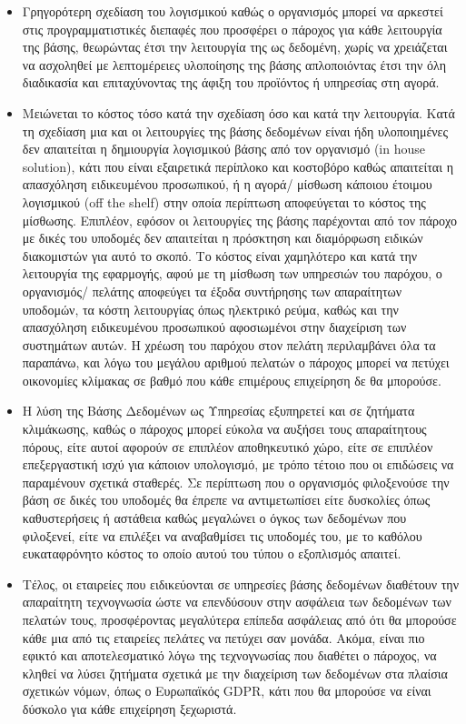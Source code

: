 \documentclass{article}
\begin{document}
\begin{itemize}
\item Γρηγορότερη σχεδίαση του λογισμικού καθώς ο οργανισμός μπορεί να αρκεστεί στις προγραμματιστικές διεπαφές που προσφέρει ο πάροχος για κάθε λειτουργία της βάσης, θεωρώντας έτσι την λειτουργία της ως δεδομένη, χωρίς να χρειάζεται να ασχοληθεί με λεπτομέρειες υλοποίησης της βάσης απλοποιόντας έτσι την όλη διαδικασία και επιταχύνοντας της άφιξη του προϊόντος ή υπηρεσίας στη αγορά.
\item Μειώνεται το κόστος τόσο κατά την σχεδίαση όσο και κατά την λειτουργία. Κατά τη σχεδίαση μια και οι λειτουργίες της βάσης δεδομένων είναι ήδη υλοποιημένες δεν απαιτείται η δημιουργία λογισμικού βάσης από τον οργανισμό (in house solution), κάτι που είναι εξαιρετικά περίπλοκο και κοστοβόρο καθώς απαιτείται η απασχόληση ειδικευμένου προσωπικού, ή η αγορά/ μίσθωση κάποιου έτοιμου λογισμικού (off the shelf) στην οποία περίπτωση αποφεύγεται το κόστος της μίσθωσης. Επιπλέον, εφόσον οι λειτουργίες της βάσης παρέχονται από τον πάροχο με δικές του υποδομές δεν απαιτείται η πρόσκτηση και διαμόρφωση ειδικών διακομιστών για αυτό το σκοπό. Το κόστος είναι χαμηλότερο και κατά την λειτουργία της εφαρμογής, αφού με τη μίσθωση των υπηρεσιών του παρόχου, ο οργανισμός/ πελάτης αποφεύγει τα έξοδα συντήρησης των απαραίτητων υποδομών, τα κόστη λειτουργίας όπως ηλεκτρικό ρεύμα, καθώς και την απασχόληση ειδικευμένου προσωπικού αφοσιωμένοι στην διαχείριση των συστημάτων αυτών. Η χρέωση του παρόχου στον πελάτη περιλαμβάνει όλα τα παραπάνω, και λόγω του μεγάλου αριθμού πελατών ο πάροχος μπορεί να πετύχει οικονομίες κλίμακας σε βαθμό που κάθε επιμέρους επιχείρηση δε θα μπορούσε.
\item Η λύση της Βάσης Δεδομένων ως Υπηρεσίας εξυπηρετεί και σε ζητήματα κλιμάκωσης, καθώς ο πάροχος μπορεί εύκολα να αυξήσει τους απαραίτητους πόρους, είτε αυτοί αφορούν σε επιπλέον αποθηκευτικό χώρο, είτε σε επιπλέον επεξεργαστική ισχύ για κάποιον υπολογισμό, με τρόπο τέτοιο που οι επιδώσεις να παραμένουν σχετικά σταθερές. Σε περίπτωση που ο οργανισμός φιλοξενούσε την βάση σε δικές του υποδομές θα έπρεπε να αντιμετωπίσει είτε δυσκολίες όπως καθυστερήσεις ή αστάθεια καθώς μεγαλώνει ο όγκος των δεδομένων που φιλοξενεί, είτε να επιλέξει να αναβαθμίσει τις υποδομές του, με το καθόλου ευκαταφρόνητο κόστος το οποίο αυτού του τύπου ο εξοπλισμός απαιτεί.
\item Τέλος, οι εταιρείες που ειδικεύονται σε υπηρεσίες βάσης δεδομένων διαθέτουν την απαραίτητη τεχνογνωσία ώστε να επενδύσουν στην ασφάλεια των δεδομένων των πελατών τους, προσφέροντας μεγαλύτερα επίπεδα ασφάλειας από ότι θα μπορούσε κάθε μια από τις εταιρείες πελάτες να πετύχει σαν μονάδα. Ακόμα, είναι πιο εφικτό και αποτελεσματικό λόγω της τεχνογνωσίας που διαθέτει ο πάροχος, να κληθεί να λύσει ζητήματα σχετικά με την διαχείριση των δεδομένων στα πλαίσια σχετικών νόμων, όπως ο Ευρωπαϊκός GDPR, κάτι που θα μπορούσε να είναι δύσκολο για κάθε επιχείρηση ξεχωριστά.
\end{itemize}
\end{document}
